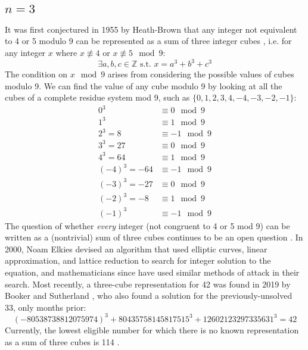 \documentclass{article}
\begin{document}
\begin{flushleft}
\subsection{$n=3$}
It was first conjectured in 1955 by Heath-Brown \cite{heath-brown} that any integer not equivalent to 4 or 5 modulo 9 can be represented as a sum of three integer cubes \cite{threecubes}, i.e. for any integer $x$ where $x \not\equiv 4$ or $x \not\equiv 5 \mod 9$:
\begin{equation}
    \exists a, b, c \in \mathbb{Z} \text{ s.t. } x=a^3+b^3+c^3
\end{equation}
The condition on $x \mod 9$ arises from considering the possible values of cubes modulo 9. We can find the value of any cube modulo 9 by looking at all the cubes of a complete residue system mod 9, such as $\{0, 1, 2, 3, 4, -4, -3, -2, -1\}$:
\begin{align*}
    0^3 &\equiv 0 \mod 9 \\
    1^3 &\equiv 1 \mod 9 \\
    2^3=8 &\equiv -1 \mod 9 \\
    3^3=27 &\equiv 0 \mod 9 \\
    4^3 =64 &\equiv 1 \mod 9 \\
    (-4)^3 = -64 &\equiv -1 \mod 9 \\
    (-3)^3 =-27&\equiv 0 \mod 9 \\
    (-2)^3 = -8 &\equiv 1 \mod 9 \\
    (-1)^3 &\equiv -1 \mod 9 
\end{align*}
The question of whether \textit{every} integer (not congruent to 4 or 5 mod 9) can be written as a (nontrivial) sum of three cubes continues to be an open question \cite{threecubes}. In 2000, Noam Elkies \cite{elkies} devised an algorithm that used elliptic curves, linear approximation, and lattice reduction to search for integer solution to the equation, and mathematicians since have used similar methods of attack in their search. Most recently, a three-cube representation for 42 was found in 2019 by Booker and Sutherland \cite{threecubes}, who also found a solution for the previously-unsolved 33, only months prior:
\begin{equation*}
    (-80538738812075974)^3 + 80435758145817515^3 + 12602123297335631^3 = 42
\end{equation*}Currently, the lowest eligible number for which there is no known representation as a sum of three cubes is 114 \cite{threecubes}. \vspace{.1in}


\end{flushleft}
\end{document}
